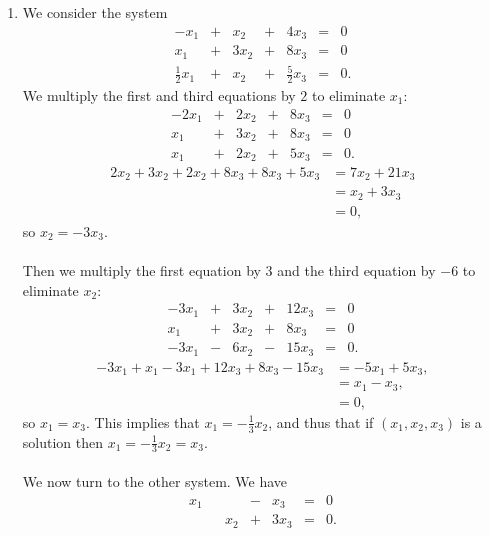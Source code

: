 \documentclass[12pt]{article}
\begin{document}
\begin{enumerate}
    \item
      We consider the system
      \[
      \begin{array}{rcrcrcl}
        -x_1           & + & x_2  & + & 4x_3           & = & 0\\
         x_1           & + & 3x_2 & + & 8x_3           & = & 0\\
        \frac{1}{2}x_1 & + & x_2  & + & \frac{5}{2}x_3 & = & 0.
      \end{array}
      \]
      We multiply the first and third equations by $2$ to
      eliminate $x_1$:
      \[
      \begin{array}{rcrcrcl}
        -2x_1 & + & 2x_2 & + & 8x_3 & = & 0\\
          x_1 & + & 3x_2 & + & 8x_3 & = & 0\\
          x_1 & + & 2x_2 & + & 5x_3 & = & 0.
      \end{array}
      \]
      \begin{align*}
        2x_2 + 3x_2 + 2x_2 + 8x_3 + 8x_3 + 5x_3 &= 7x_2 + 21x_3\\
        &= x_2 + 3x_3\\
        &= 0,
      \end{align*}
      so $x_2 = -3x_3$.\\\\
      Then we multiply the first equation by $3$ and the third
      equation by $-6$ to eliminate $x_2$:
      \[
      \begin{array}{rcrcrcl}
        -3x_1 & + & 3x_2 & + & 12x_3 & = & 0\\
          x_1 & + & 3x_2 & + &  8x_3 & = & 0\\
        -3x_1 & - & 6x_2 & - & 15x_3 & = & 0.
      \end{array}
      \]
      \begin{align*}
        -3x_1 + x_1 - 3x_1 + 12x_3 + 8x_3 - 15x_3 &= -5x_1 + 5x_3,\\
        &= x_1 - x_3,\\
        &= 0,
      \end{align*}
      so $x_1 = x_3$. This implies that $x_1 = -\frac{1}{3}x_2$,
      and thus that if $(x_1,x_2,x_3)$ is a solution then $x_1 =
      -\frac{1}{3}x_2 = x_3$.\\\\
      We now turn to the other system. We have
      \[
      \begin{array}{rcrcrcl}
        x_1 &   &     & - &  x_3 & = & 0\\
            &   & x_2 & + & 3x_3 & = & 0.\\

\end{array}\]
\end{enumerate}
\end{document}
